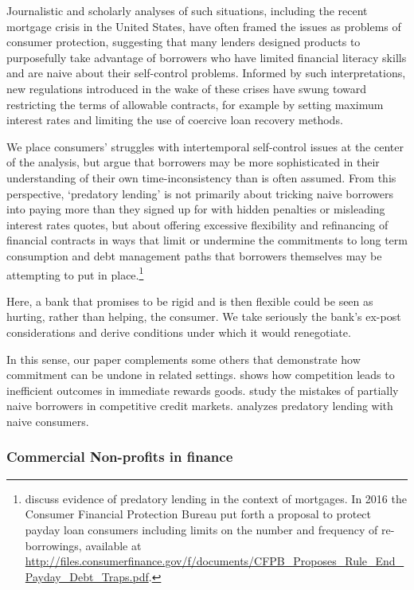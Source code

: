 \documentclass[11pt,english]{article}
\theoremstyle{plain}
\theoremstyle{definition}
\begin{document}
Journalistic and scholarly analyses of such situations, including
the recent mortgage crisis in the United States, have often framed
the issues as problems of consumer protection, suggesting that many
lenders designed products to purposefully take advantage of borrowers
who have limited financial literacy skills and are naive about their
self-control problems. Informed by such interpretations, new regulations
introduced in the wake of these crises have swung toward restricting
the terms of allowable contracts, for example by setting maximum interest
rates and limiting the use of coercive loan recovery methods.

We place consumers' struggles with intertemporal self-control issues
at the center of the analysis, but argue that borrowers may be more
sophisticated in their understanding of their own time-inconsistency
than is often assumed. From this perspective, `predatory lending'
is not primarily about tricking naive borrowers into paying more than
they signed up for with hidden penalties or misleading interest rates
quotes, but about offering excessive flexibility and refinancing of
financial contracts in ways that limit or undermine the commitments
to long term consumption and debt management paths that borrowers
themselves may be attempting to put in place.\footnote{\citet{bond2009} discuss evidence of predatory lending
in the context of mortgages. In 2016 the Consumer Financial Protection
Bureau put forth a proposal to protect payday loan consumers including
limits on the number and frequency of re-borrowings, available at
\url{http://files.consumerfinance.gov/f/documents/CFPB_Proposes_Rule_End_Payday_Debt_Traps.pdf}.}

Here, a bank that promises to be rigid and is then flexible could
be seen as hurting, rather than helping, the consumer. We take seriously
the bank's ex-post considerations and derive conditions under which
it would renegotiate.

In this sense, our paper complements some others that demonstrate
how commitment can be undone in related settings. \citet{gottlieb2008}
shows how competition leads to inefficient outcomes in immediate rewards
goods. \citet{heidhues2010} study the mistakes of partially
naive borrowers in competitive credit markets. \citet{mendez2012}
analyzes predatory lending with naive consumers. 
\subsubsection{Commercial Non-profits in finance}
\end{document}
